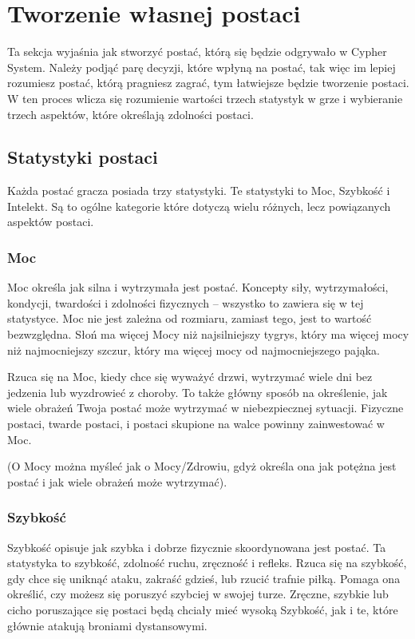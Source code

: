 \chapter{Tworzenie własnej postaci}

Ta sekcja wyjaśnia jak stworzyć postać, którą się będzie odgrywało w Cypher System. Należy podjąć parę decyzji, które wpłyną na postać, tak więc im lepiej rozumiesz postać, którą pragniesz zagrać, tym łatwiejsze będzie tworzenie postaci. W ten proces wlicza się rozumienie wartości trzech statystyk w grze i wybieranie trzech aspektów, które określają zdolności postaci.

\section{Statystyki postaci}

Każda postać gracza posiada trzy statystyki. Te statystyki to Moc, Szybkość i Intelekt. Są to ogólne kategorie które dotyczą wielu różnych, lecz powiązanych aspektów postaci.

\subsection{Moc}

Moc określa jak silna i wytrzymała jest postać. Koncepty siły, wytrzymałości, kondycji, twardości i zdolności fizycznych – wszystko to zawiera się w tej statystyce. Moc nie jest zależna od rozmiaru, zamiast tego, jest to wartość bezwzględna. Słoń ma więcej Mocy niż najsilniejszy tygrys, który ma więcej mocy niż najmocniejszy szczur, który ma więcej mocy od najmocniejszego pająka.

Rzuca się na Moc, kiedy chce się wyważyć drzwi, wytrzymać wiele dni bez jedzenia lub wyzdrowieć z choroby. To także główny sposób na określenie, jak wiele obrażeń Twoja postać może wytrzymać w niebezpiecznej sytuacji. Fizyczne postaci, twarde postaci, i postaci skupione na walce powinny zainwestować w Moc.

(O Mocy można myśleć jak o Mocy/Zdrowiu, gdyż określa ona jak potężna jest postać i jak wiele obrażeń może wytrzymać).

\subsection{Szybkość}

Szybkość opisuje jak szybka i dobrze fizycznie skoordynowana jest postać. Ta statystyka to szybkość, zdolność ruchu, zręczność i refleks. Rzuca się na szybkość, gdy chce się uniknąć ataku, zakraść gdzieś, lub rzucić trafnie piłką. Pomaga ona określić, czy możesz się poruszyć szybciej w swojej turze. Zręczne, szybkie lub cicho poruszające się postaci będą chciały mieć wysoką Szybkość, jak i te, które głównie atakują broniami dystansowymi. 

